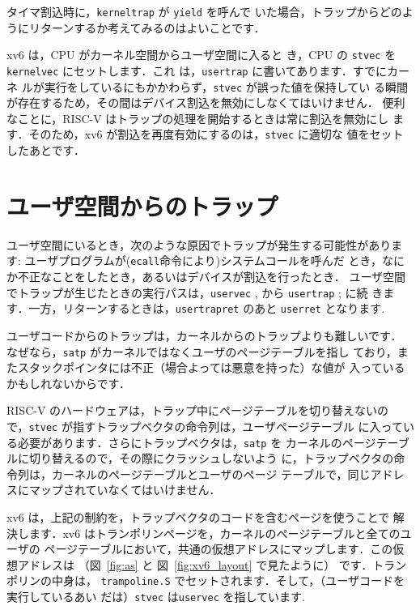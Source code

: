 タイマ割込時に，\texttt{kerneltrap} が \texttt{yield} を呼んで
いた場合，トラップからどのようにリターンするか考えてみるのはよいことです．

xv6 は，CPU がカーネル空間からユーザ空間に入ると
き，CPU の \texttt{stvec} を \texttt{kernelvec} にセットします．これ
は，\texttt{usertrap} 
に書いてあります．すでにカーネ
ルが実行をしているにもかかわらず，\texttt{stvec} が誤った値を保持してい
る瞬間が存在するため，その間はデバイス割込を無効にしなくてはいけません．
便利なことに，RISC-V はトラップの処理を開始するときは常に割込を無効にし
ます．そのため，xv6 が割込を再度有効にするのは，\texttt{stvec} に適切な
値をセットしたあとです．

\section{ユーザ空間からのトラップ}

ユーザ空間にいるとき，次のような原因でトラップが発生する可能性がありま
す: ユーザプログラムが(\texttt{ecall}命令により)システムコールを呼んだ
とき，なにか不正なことをしたとき，あるいはデバイスが割込を行ったとき．
ユーザ空間でトラップが生じたときの実行パスは，\texttt{uservec}
,
から \texttt{usertrap}
;
に続
きます．一方，リターンするときは，\texttt{usertrapret}
のあと \texttt{userret} 
となります.

ユーザコードからのトラップは，カーネルからのトラップよりも難しいです．
なぜなら，\texttt{satp} がカーネルではなくユーザのページテーブルを指し
ており，またスタックポインタには不正（場合よっては悪意を持った）な値が
入っているかもしれないからです．

RISC-V のハードウェアは，トラップ中にページテーブルを切り替えないの
で，\texttt{stvec} が指すトラップベクタの命令列は，ユーザページテーブル
に入っている必要があります．さらにトラップベクタは，\texttt{satp} を
カーネルのページテーブルに切り替えるので，その際にクラッシュしないよう
に，トラップベクタの命令列は，カーネルのページテーブルとユーザのページ
テーブルで，同じアドレスにマップされていなくてはいけません．

xv6 は，上記の制約を，トラップベクタのコードを含むページを使うことで
解決します．xv6 はトランポリンページを，カーネルのページテーブルと全てのユーザの
ページテーブルにおいて，共通の仮想アドレスにマップします．この仮想アドレスは
（図~\ref{fig:as} と 図~\ref{fig:xv6_layout} で見たように） です．トランポリンの中身は，
\texttt{trampoline.S} でセットされます．そして，（ユーザコードを実行しているあい
だは）\texttt{stvec} は\texttt{uservec} 
を指しています.

